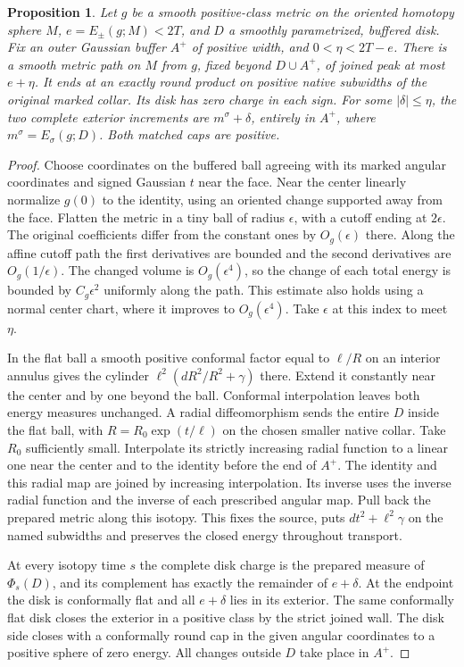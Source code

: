 \documentclass[11pt,letterpaper]{article}
\numberwithin{equation}{section}
\newtheorem{proposition}{Proposition}[section]
\begin{document}
\begin{proposition}\label{prop:disk-transport}
Let \(g\) be a smooth positive-class metric on the oriented homotopy
sphere \(M\), \(e=E_\pm(g;M)<2T\), and \(D\) a smoothly parametrized,
buffered disk. Fix an outer Gaussian buffer \(A^+\) of positive
width, and \(0<\eta<2T-e\). There is a smooth metric path on \(M\)
from \(g\), fixed beyond \(D\cup A^+\), of joined peak at most
\(e+\eta\). It ends at an exactly round product on positive native
subwidths of the original marked collar. Its disk has zero charge
in each sign. For some \(|\delta|\le\eta\), the two complete
exterior increments are \(m^\sigma+\delta\), entirely in \(A^+\),
where \(m^\sigma=E_\sigma(g;D)\). Both matched caps are positive.
\end{proposition}
\begin{proof}
Choose coordinates on the buffered ball agreeing with its marked
angular coordinates and signed Gaussian \(t\) near the face.
Near the center linearly normalize \(g(0)\) to the identity, using
an oriented change supported away from the face. Flatten the metric
in a tiny ball of radius \(\epsilon\), with a cutoff ending at
\(2\epsilon\). The original coefficients differ from the constant
ones by \(O_g(\epsilon)\) there. Along the affine cutoff path the
first derivatives are bounded and the second derivatives are
\(O_g(1/\epsilon)\). The changed volume is \(O_g(\epsilon^4)\),
so the change of each total energy is bounded by \(C_g\epsilon^2\)
uniformly along the path. This estimate also holds using a normal
center chart, where it improves to \(O_g(\epsilon^4)\).
Take \(\epsilon\) at this index to meet \(\eta\).

In the flat ball a smooth positive conformal factor equal to
\(\ell/R\) on an interior annulus gives the cylinder
\(\ell^2(dR^2/R^2+\gamma)\) there. Extend it constantly near the
center and by one beyond the ball. Conformal interpolation leaves
both energy measures unchanged. A radial diffeomorphism sends
the entire \(D\) inside the flat ball, with
\(R=R_0\exp(t/\ell)\) on the chosen smaller native collar.
Take \(R_0\) sufficiently small. Interpolate its strictly
increasing radial function to a linear one near the center and
to the identity before the end of \(A^+\). The identity and this
radial map are joined by increasing interpolation. Its inverse uses
the inverse radial function and the inverse of each prescribed
angular map. Pull back the prepared metric along this isotopy.
This fixes the source, puts \(dt^2+\ell^2\gamma\) on the named
subwidths and preserves the closed energy throughout transport.

At every isotopy time \(s\) the complete disk charge is the prepared
measure of \(\Phi_s(D)\), and its complement has exactly the remainder
of \(e+\delta\). At the endpoint the disk is conformally flat and
all \(e+\delta\) lies in its exterior. The same conformally flat
disk closes the exterior in a positive class by the strict joined
wall. The disk side closes with a conformally round cap in the
given angular coordinates to a positive sphere of zero energy.
All changes outside \(D\) take place in \(A^+\).
\end{proof}
\end{document}

